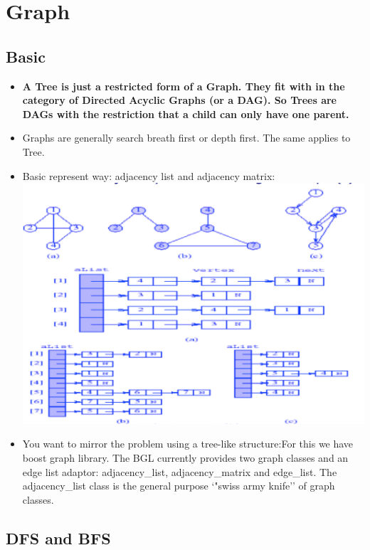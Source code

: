 \documentclass[a4paper,12pt,twoside]{book}
\begin{document}
        \section{Graph}
\subsection{Basic}
\begin{itemize}
\item \textbf{A Tree is just a restricted form of a Graph. They fit with in the category of Directed Acyclic Graphs (or a DAG). So Trees are DAGs with the restriction that a child can only have one parent.}

\item Graphs are generally search breath first or depth first. The same applies to Tree.

\item Basic represent way: adjacency list and adjacency matrix: \newline
\includegraphics[scale=0.6]{pics/adjacency.png} \newline

\item You want to mirror the problem using a tree-like structure:For this we have boost graph library. The BGL currently provides two graph classes and an edge list adaptor: adjacency\_list, adjacency\_matrix and edge\_list.  The adjacency\_list class is the general purpose `"swiss army knife'' of graph classes.
\end{itemize}

\subsection{DFS and BFS}
\end{document}
